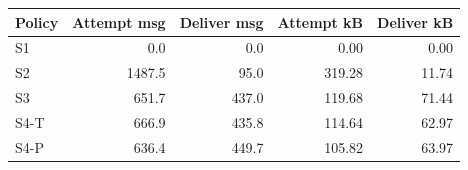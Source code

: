 \begin{tabular}{lrrrr}\toprule
Policy & Attempt msg & Deliver msg & Attempt kB & Deliver kB\\\midrule
S1 & 0.0 & 0.0 & 0.00 & 0.00\\
S2 & 1487.5 & 95.0 & 319.28 & 11.74\\
S3 & 651.7 & 437.0 & 119.68 & 71.44\\
S4-T & 666.9 & 435.8 & 114.64 & 62.97\\
S4-P & 636.4 & 449.7 & 105.82 & 63.97\\
\bottomrule\end{tabular}
